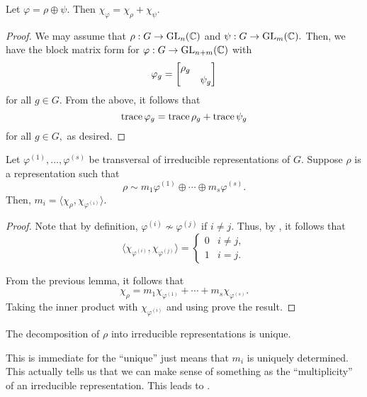 \begin{lem} \label{lem:charactersadd}
	Let $\varphi = \rho \oplus \psi.$ Then $\chi_\varphi = \chi_\rho + \chi_\psi.$
\end{lem}
\begin{proof} 
	We may assume that $\rho : G \to \operatorname{GL}_n(\mathbb{C})$ and $\psi : G \to \operatorname{GL}_m(\mathbb{C}).$ Then, we have the block matrix form for $\varphi : G \to \operatorname{GL}_{n + m}(\mathbb{C})$ with
	\begin{equation*} 
		\varphi_g = \begin{bmatrix} \rho_g &  \\  & \psi_g \end{bmatrix}
	\end{equation*}
	for all $g \in G.$ From the above, it follows that
	\begin{equation*} 
		\operatorname{trace} \varphi_g = \operatorname{trace} \rho_g + \operatorname{trace} \psi_g
	\end{equation*}
	for all $g \in G,$ as desired.
\end{proof}

\begin{thm} \label{thm:innerprodwithchi}
	Let $\varphi^{(1)}, \ldots, \varphi^{(s)}$ be transversal of irreducible representations of $G.$ Suppose $\rho$ is a representation such that
	\begin{equation*} 
		\rho \sim m_1\varphi^{(1)} \oplus \cdots \oplus m_s\varphi^{(s)}.
	\end{equation*}
	Then, $m_i = \langle \chi_\rho, \chi_{\varphi^{(i)}}\rangle.$
\end{thm}
\begin{proof} 
	Note that by definition, $\varphi^{(i)} \not\sim \varphi^{(j)}$ if $i \neq j.$ Thus, by , it follows that 
	\begin{equation} \tag{$*$} \label{eq:002}
		\langle \chi_{\varphi^{(i)}}, \chi_{\varphi^{(j)}}\rangle = \begin{cases}
			0 & i \neq j,\\
			1 & i = j.
		\end{cases}
	\end{equation}

	From the previous lemma, it follows that
	\begin{equation*} 
		\chi_\rho = m_1\chi_{\varphi^{(1)}} + \cdots + m_s\chi_{\varphi^{(s)}}.
	\end{equation*}
	Taking the inner product with $\chi_{\varphi^{(i)}}$ and using  prove the result.
\end{proof}	

\begin{cor}
	The decomposition of $\rho$ into irreducible representations is unique.
\end{cor}
This is immediate for the ``unique'' just means that $m_i$ is uniquely determined. This actually tells us that we can make sense of something as the ``multiplicity'' of an irreducible representation. This leads to .

